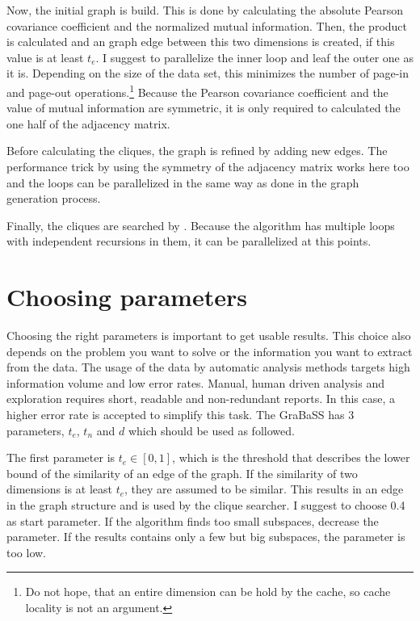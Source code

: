 Now, the initial graph is build. This is done by calculating the absolute Pearson covariance coefficient and the normalized mutual information. Then, the product is calculated and an graph edge between this two dimensions is created, if this value is at least $t_e$. I suggest to parallelize the inner loop and leaf the outer one as it is. Depending on the size of the data set, this minimizes the number of page-in and page-out operations.\footnote{Do not hope, that an entire dimension can be hold by the cache, so cache locality is not an argument.} Because the Pearson covariance coefficient and the value of mutual information are symmetric, it is only required to calculated the one half of the adjacency matrix.

Before calculating the cliques, the graph is refined by adding new edges. The performance trick by using the symmetry of the adjacency matrix works here too and the loops can be parallelized in the same way as done in the graph generation process.

Finally, the cliques are searched by \cite{listingCliques}. Because the algorithm has multiple loops with independent recursions in them, it can be parallelized at this points.

\section{Choosing parameters}
Choosing the right parameters is important to get usable results. This choice also depends on the problem you want to solve or the information you want to extract from the data. The usage of the data by automatic analysis methods targets high information volume and low error rates. Manual, human driven analysis and exploration requires short, readable and non-redundant reports. In this case, a higher error rate is accepted to simplify this task. The GraBaSS has \num{3} parameters, $t_e$, $t_n$ and $d$ which should be used as followed.

The first parameter is $t_e \in [0,1]$, which is the threshold that describes the lower bound of the similarity of an edge of the graph. If the similarity of two dimensions is at least $t_e$, they are assumed to be similar. This results in an edge in the graph structure and is used by the clique searcher. I suggest to choose \num{0.4} as start parameter. If the algorithm finds too small subspaces, decrease the parameter. If the results contains only a few but big subspaces, the parameter is too low.

